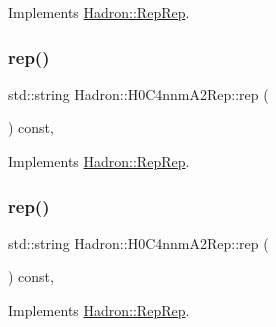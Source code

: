 Implements \mbox{\hyperlink{structHadron_1_1RepRep_ab3213025f6de249f7095892109575fde}{Hadron\+::\+Rep\+Rep}}.

\mbox{\label{structHadron_1_1H0C4nnmA2Rep_a7d5e9bf3b8a6abda949a015707a87dff}} 
\subsubsection{\texorpdfstring{rep()}{rep()}\hspace{0.1cm}{\footnotesize\ttfamily [2/5]}}
{\footnotesize\ttfamily std\+::string Hadron\+::\+H0\+C4nnm\+A2\+Rep\+::rep (\begin{DoxyParamCaption}{ }\end{DoxyParamCaption}) const\hspace{0.3cm}{\ttfamily [inline]}, {\ttfamily [virtual]}}



Implements \mbox{\hyperlink{structHadron_1_1RepRep_ab3213025f6de249f7095892109575fde}{Hadron\+::\+Rep\+Rep}}.

\mbox{\label{structHadron_1_1H0C4nnmA2Rep_a7d5e9bf3b8a6abda949a015707a87dff}} 
\subsubsection{\texorpdfstring{rep()}{rep()}\hspace{0.1cm}{\footnotesize\ttfamily [3/5]}}
{\footnotesize\ttfamily std\+::string Hadron\+::\+H0\+C4nnm\+A2\+Rep\+::rep (\begin{DoxyParamCaption}{ }\end{DoxyParamCaption}) const\hspace{0.3cm}{\ttfamily [inline]}, {\ttfamily [virtual]}}



Implements \mbox{\hyperlink{structHadron_1_1RepRep_ab3213025f6de249f7095892109575fde}{Hadron\+::\+Rep\+Rep}}.

\mbox{\label{structHadron_1_1H0C4nnmA2Rep_a7d5e9bf3b8a6abda949a015707a87dff}} 
